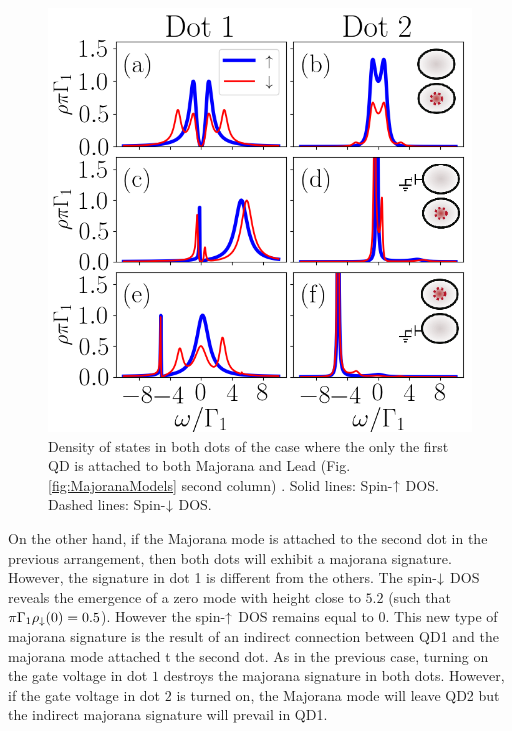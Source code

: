 \documentclass[showpacs,aps,prb,reprint,superscriptaddress]{revtex4-1}
\begin{document}
\begin{figure}[bt]
\begin{center}
\includegraphics[scale=0.48]{Graficos/t1>0.png}
\caption{  \label{fig:Interference} Density of states in both dots of the case where the only the first QD is attached to both Majorana and Lead (Fig.\ref{fig:MajoranaModels} second column) . Solid lines: Spin-$\uparrow$ DOS. Dashed lines: Spin-$\downarrow$ DOS.
}
%
\label{fig:GenModel}
\end{center}
\end{figure}


    On the other hand, if the Majorana mode is attached to the second dot in the previous arrangement, then both dots will exhibit a majorana signature. However, the signature in dot 1 is different from the others. The spin-$\downarrow$ DOS reveals the emergence of a zero mode with height close to $5.2$ (such that $\pi  \Gamma_1 \rho_\downarrow(0) = 0.5$). However the spin-$\uparrow$ DOS remains equal to $0$. This new type of majorana signature is the result of an indirect connection between QD1 and the majorana mode attached t the second dot. As in the previous case, turning on the gate voltage in dot $1$ destroys the majorana signature in both dots. However, if the gate voltage in dot $2$ is turned on, the Majorana mode will leave QD2 but the indirect majorana signature will prevail in QD1. 
    
\end{document}
